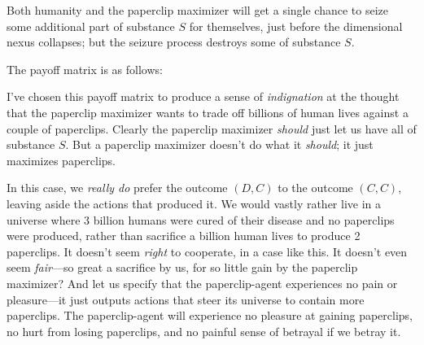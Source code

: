 {
 Both humanity and the paperclip maximizer will get a single chance
to seize some additional part of substance $S$ for themselves, just
before the dimensional nexus collapses; but the seizure process
destroys some of substance $S$.}

{
 The payoff matrix is as follows:}

\begin{center}
\end{center}

{
 I've chosen this
payoff matrix to produce a sense of \textit{indignation} at the thought
that the paperclip maximizer wants to trade off billions of human lives
against a couple of paperclips. Clearly the paperclip maximizer
\textit{should} just let us have all of substance $S$. But a paperclip
maximizer doesn't do what it \textit{should}; it just
maximizes paperclips.}

{
 In this case, we \textit{really do} prefer the outcome $(D,C)$ to
the outcome $(C,C)$, leaving aside the actions that produced it. We would
vastly rather live in a universe where 3 billion humans were cured of
their disease and no paperclips were produced, rather than sacrifice a
billion human lives to produce 2 paperclips. It doesn't
seem \textit{right} to cooperate, in a case like this. It
doesn't even seem \textit{fair}{}---so great a
sacrifice by us, for so little gain by the paperclip maximizer? And let
us specify that the paperclip-agent experiences no pain or
pleasure---it just outputs actions that steer its universe to contain
more paperclips. The paperclip-agent will experience no pleasure at
gaining paperclips, no hurt from losing paperclips, and no painful
sense of betrayal if we betray it.}

